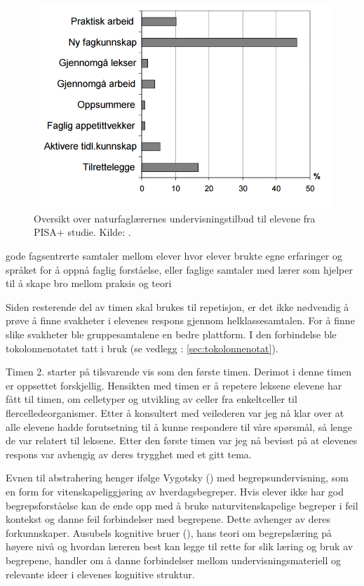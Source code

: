 \documentclass[main.tex]{subfiles}
\begin{document}
\begin{figure}[h!]
\includegraphics[scale = 0.6]{../figures/undervisnings_aktivitet.png}
\caption{Oversikt over naturfaglærernes undervisningstilbud til elevene fra PISA+ studie. Kilde: \protect{}.}
\label{fig:odeg10}
\end{figure}

gode fagsentrerte samtaler mellom elever hvor elever brukte egne erfaringer
og språket for å oppnå faglig forståelse, eller faglige samtaler med lærer som hjelper til å skape
bro mellom praksis og teori 



Siden resterende del av timen skal brukes til repetisjon, er det ikke nødvendig å 
prøve å finne svakheter i elevenes respons gjennom helklassesamtalen. For å finne slike svakheter 
ble gruppesamtalene en bedre plattform. I den forbindelse ble tokolonnenotatet tatt i bruk (se 
vedlegg : \ref{sec:tokolonnenotat}).

Timen 2. starter på tilsvarende vis som den første timen. Derimot i denne timen er oppsettet 
forskjellig. Hensikten med timen er å repetere leksene elevene har fått til timen, om celletyper og
utvikling av celler fra enkeltceller til flercelledeorganismer. Etter å konsultert med veilederen
var jeg nå klar over at alle elevene hadde forutsetning til å kunne respondere til våre spørsmål, 
så lenge de var relatert til leksene. Etter den første timen var jeg nå bevisst på at elevenes 
respons var avhengig av deres trygghet med et gitt tema. 

Evnen til abstrahering henger ifølge Vygotsky () med begrepsundervisning, som en
form for vitenskapeliggjøring av hverdagsbegreper. Hvis elever ikke har god begrepsforståelse
kan de ende opp med å bruke naturvitenskapelige begreper i feil kontekst og danne feil 
forbindelser med begrepene. Dette avhenger av deres forkunnskaper. Ausubels kognitive bruer 
(), hans teori om begrepslæring på høyere nivå og hvordan læreren best kan legge 
til rette for slik læring og bruk av begrepene,  handler om å danne forbindelser mellom undervisningsmateriell
og relevante ideer i elevenes kognitive struktur.
\end{document}
